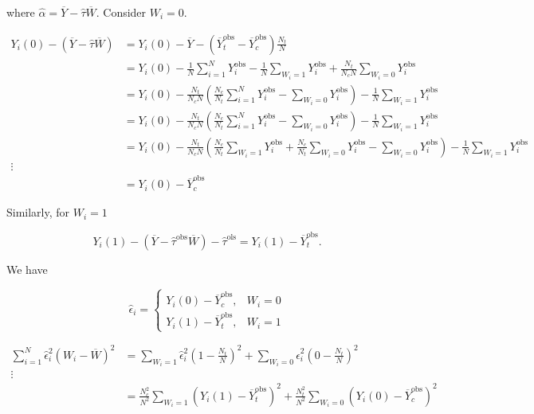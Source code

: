 where \(\hat{\alpha} = \overline{Y} - \hat{\tau} \overline{W}\). Consider \(W_i = 0\).

\begin{align*}
Y_i(0)  -  \left( \overline{Y} - \hat{\tau} \overline{W} \right)  & =  Y_i(0)  -  \overline{Y} - \left( \overline{Y}_t^{\text{obs}} - \overline{Y}_c^{\text{obs}} \right) \frac{N_t}{N}
\\ & =  Y_i(0)  -  \frac{1}{N} \sum_{i=1}^N Y_i^{\text{obs}} - \frac{1}{N}\sum_{W_i = 1} Y_i^{\text{obs}}  + \frac{N_t}{N_c N }\sum_{W_i = 0} Y_i^{\text{obs}} 
\\ & =  Y_i(0)  -  \frac{N_t}{N_c N} \left(  \frac{N_c}{N_t} \sum_{i=1}^N Y_i^{\text{obs}}   - \sum_{W_i = 0} Y_i^{\text{obs}}  \right) - \frac{1}{N} \sum_{W_i = 1} Y_i^{\text{obs}}
\\ & =  Y_i(0)  -  \frac{N_t}{N_c N} \left(  \frac{N_c}{N_t} \sum_{i=1}^N Y_i^{\text{obs}}   - \sum_{W_i = 0} Y_i^{\text{obs}} \right) - \frac{1}{N} \sum_{W_i = 1} Y_i^{\text{obs}} 
\\ & =  Y_i(0)  -  \frac{N_t}{N_c N} \left(  \frac{N_c}{N_t} \sum_{W_i=1} Y_i^{\text{obs}}  + \frac{N_c}{N_t} \sum_{W_i=0} Y_i^{\text{obs}}  - \sum_{W_i = 0} Y_i^{\text{obs}} \right) - \frac{1}{N} \sum_{W_i = 1} Y_i^{\text{obs}} 
\\ \vdots
\\ & = Y_i(0) - \overline{Y}_c^{\text{obs}}
\end{align*}

Similarly, for \(W_i = 1\)

\[
Y_i(1) - (\overline{Y} - \hat{\tau}^{\text{obs}} \overline{W} ) - \hat{\tau}^{\text{ols}} = Y_i(1) - \overline{Y}_t^{\text{obs}}.
\]

We have

\[
\hat{\epsilon}_i = \begin{cases}
Y_i(0) - \overline{Y}_c^{\text{obs}}, & W_i = 0 \\
Y_i(1) - \overline{Y}_t^{\text{obs}}, & W_i = 1
\end{cases}
\]

\begin{align*}
\sum_{i=1}^N \hat{\epsilon}_i^2(W_i - \overline{W})^2 &  = \sum_{W_i = 1} \hat{\epsilon}_i^2 (1 - \frac{N_t}{N} ) ^2 + \sum_{W_i = 0} \hat{\epsilon}_i^2(0 - \frac{N_t}{N})^2
\\ \vdots
\\  &  =  \frac{N_c^2}{N^2} \sum_{W_i = 1}(Y_i(1) - \overline{Y}_t^{\text{obs}} )^2 + \frac{N_t^2}{N^2} \sum_{W_i = 0} (Y_i(0) - \overline{Y}_c^{\text{obs}})^2
\end{align*}

